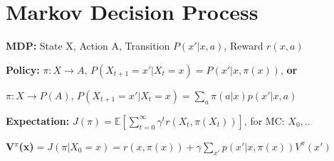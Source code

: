 \begin{comment}
	\pagebreak
\end{comment}

\section{Markov Decision Process}
\begin{comment}
	\textbf{Probabilistic planning:} How should we control an agent to accomplish some goal\\
\end{comment}

\textbf{MDP:} State X, Action A, Transition $P(x'|x,a)$, Reward $r(x,a)$\\
\begin{comment}
	We have an observable state and a finite number of actions. 
	The actions are dictated by the task and the environment, while the reward function gives us room for design choices.
	Each transition probability is independent, giving it the Markovian assumption. We only care about where an actor currently is, not were he was.\\
\end{comment}

\textbf{Policy:} $\pi: X \rightarrow A$, $P(X_{t+1} = x' | X_t = x) = P(x' | x, \pi(x))$, \textbf{or}\\
\begin{comment}
	Deterministic Policy\\
\end{comment}
$\pi: X \rightarrow P(A)$, $P(X_{t+1} = x' | X_t = x) = \sum_a \pi(a|x) p(x'|x,a)$\\
\begin{comment}
	Probabilistic Policy\\
\end{comment}

\textbf{Expectation:} $J(\pi) = \mathbb{E}[\sum_{t=0}^\infty \gamma^t r(X_t, \pi(X_t))]$, for MC: $X_0,..$\\
\begin{comment}
	\textbf{Note:} This expectation depends on the inital state of the MC.
	We can use gamma to regulate how much we care about future rewards.\\
\end{comment}

\textbf{V$^\pi$(x)}$ = J(\pi|X_0=x)
= r(x, \pi(x)) + \gamma \sum_{x'} p(x'|x,\pi(x)) V^\pi(x')$\\
\begin{comment}
	The value function at a specific state x incorporates the reward at this  state when acting after policy $\pi$, and expected reward it could get.\\
	It is recursively defined, using the expected rewards of other reachable states through their value function.\\
\end{comment}

